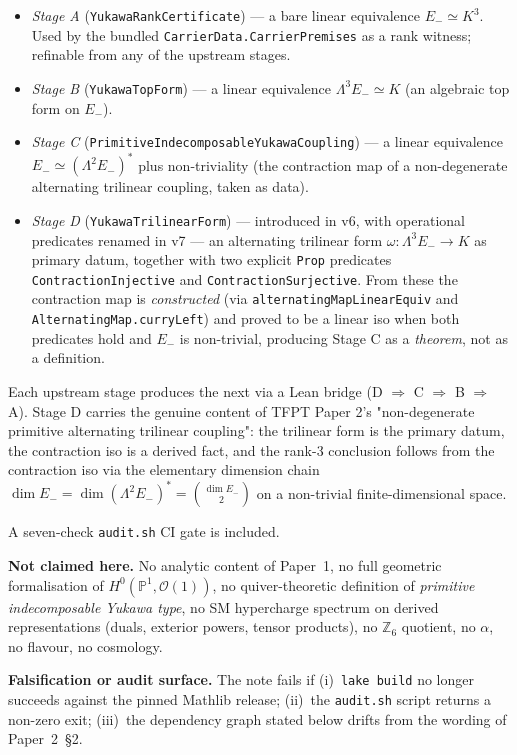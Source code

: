 \documentclass[11pt,a4paper]{article}
\begin{document}
\begin{tfptfrontbox}
\begin{itemize}[leftmargin=1.5em, itemsep=1pt]
\item \emph{Stage A} (\texttt{YukawaRankCertificate}) --- a
    bare linear equivalence $E_- \simeq K^3$. Used by the
    bundled \texttt{CarrierData.CarrierPremises} as a rank
    witness; refinable from any of the upstream stages.
\item \emph{Stage B} (\texttt{YukawaTopForm}) --- a linear
    equivalence $\Lambda^3 E_- \simeq K$ (an algebraic top
    form on $E_-$).
\item \emph{Stage C} (\texttt{PrimitiveIndecomposableYukawaCoupling})
    --- a linear equivalence $E_- \simeq (\Lambda^2 E_-)^*$
    plus non-triviality (the contraction map of a non-degenerate
    alternating trilinear coupling, taken as data).
\item \emph{Stage D} (\texttt{YukawaTrilinearForm}) --- introduced
    in v6, with operational predicates renamed in v7 --- an
    alternating trilinear form $\omega : \Lambda^3 E_- \to K$ as
    primary datum, together with two explicit \texttt{Prop}
    predicates \texttt{ContractionInjective} and
    \texttt{ContractionSurjective}. From these the contraction
    map is \emph{constructed} (via
    \texttt{alternatingMapLinearEquiv} and
    \texttt{AlternatingMap.curryLeft}) and proved to be a linear
    iso when both predicates hold and $E_-$ is non-trivial,
    producing Stage C as a \emph{theorem}, not as a definition.
\end{itemize}

Each upstream stage produces the next via a Lean bridge
(D $\Rightarrow$ C $\Rightarrow$ B $\Rightarrow$ A). Stage D
carries the genuine content of TFPT Paper 2's
"non-degenerate primitive alternating trilinear coupling": the
trilinear form is the primary datum, the contraction iso is a
derived fact, and the rank-3 conclusion follows from the
contraction iso via the elementary dimension chain
$\dim E_- = \dim (\Lambda^2 E_-)^* = \binom{\dim E_-}{2}$ on a
non-trivial finite-dimensional space.

A seven-check \texttt{audit.sh} CI gate is included.

\textbf{Not claimed here.} No analytic content of Paper~1, no full
geometric formalisation of $H^0(\mathbb P^1, \mathcal O(1))$, no
quiver-theoretic definition of \emph{primitive indecomposable
Yukawa type}, no SM hypercharge spectrum on derived
representations (duals, exterior powers, tensor products), no
$\mathbb Z_6$ quotient, no $\alpha$, no flavour, no cosmology.

\textbf{Falsification or audit surface.} The note fails if
(i)~\texttt{lake build} no longer succeeds against the pinned
Mathlib release; (ii)~the \texttt{audit.sh} script returns a
non-zero exit; (iii)~the dependency graph stated below drifts from
the wording of Paper~2~\S2.
\end{tfptfrontbox}
\end{document}
